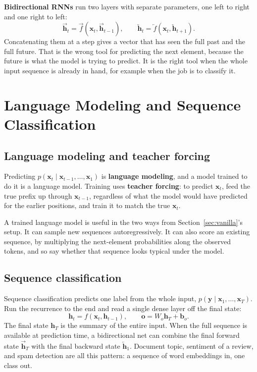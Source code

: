 \documentclass[11pt]{article}
\begin{document}
\textbf{Bidirectional RNNs} run two layers with separate parameters, one
left to right and one right to left:
\[
\overrightarrow{\mathbf{h}}_t
=
\overrightarrow{f}(\mathbf{x}_t,\overrightarrow{\mathbf{h}}_{t-1}),
\qquad
\overleftarrow{\mathbf{h}}_t
=
\overleftarrow{f}(\mathbf{x}_t,\overleftarrow{\mathbf{h}}_{t+1}).
\]
Concatenating them at a step gives a vector that has seen the full past and
the full future. That is the wrong tool for predicting the next element,
because the future is what the model is trying to predict. It is the right
tool when the whole input sequence is already in hand, for example when the
job is to classify it.

\section{Language Modeling and Sequence Classification}

\subsection{Language modeling and teacher forcing}

Predicting \(p(\mathbf{x}_t\mid\mathbf{x}_{t-1},\ldots,\mathbf{x}_1)\) is
\textbf{language modeling}, and a model trained to do it is a language
model. Training uses \textbf{teacher forcing}: to predict \(\mathbf{x}_t\),
feed the true prefix up through \(\mathbf{x}_{t-1}\), regardless of what
the model would have predicted for the earlier positions, and train it to
match the true \(\mathbf{x}_t\).

A trained language model is useful in the two ways from
Section~\ref{sec:vanilla}'s setup. It can sample new sequences
autoregressively. It can also score an existing sequence, by multiplying
the next-element probabilities along the observed tokens, and so say
whether that sequence looks typical under the model.

\subsection{Sequence classification}

Sequence classification predicts one label from the whole input,
\(p(\mathbf{y}\mid\mathbf{x}_1,\ldots,\mathbf{x}_T)\). Run the recurrence to
the end and read a single dense layer off the final state:
\[
\mathbf{h}_t=f(\mathbf{x}_t,\mathbf{h}_{t-1}),
\qquad
\mathbf{o}=W_o\mathbf{h}_T+\mathbf{b}_o.
\]
The final state \(\mathbf{h}_T\) is the summary of the entire input. When
the full sequence is available at prediction time, a bidirectional net can
combine the final forward state \(\overrightarrow{\mathbf{h}}_T\) with the
final backward state \(\overleftarrow{\mathbf{h}}_1\). Document topic,
sentiment of a review, and spam detection are all this pattern: a sequence
of word embeddings in, one class out.
\end{document}
